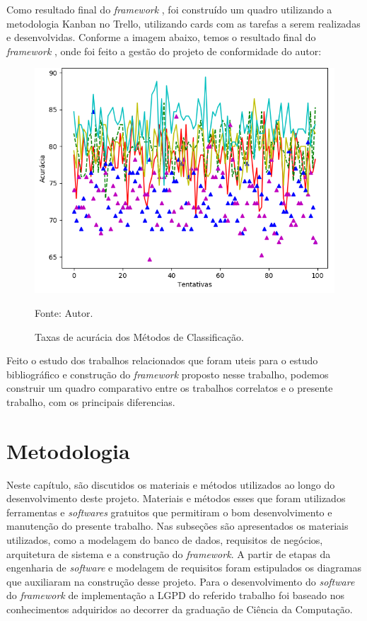 \documentclass[
	12pt,				%
	openright,			%
	oneside,			%
	a4paper,			%
	english,			%
	french,				%
	spanish,			%
	brazil,				%
	]{abntex2}
\begin{document}
Como resultado final do \textit{framework} , foi construído um quadro utilizando a metodologia Kanban no Trello, utilizando cards com as tarefas a serem realizadas e desenvolvidas. Conforme a imagem abaixo, temos o resultado final do \textit{framework} , onde foi feito a gestão do projeto de conformidade do autor:

\begin{figure}[ht]
    \centering
    \caption{Taxas de acurácia dos Métodos de Classificação.}
    \includegraphics[width=5.0in]{Images/acc-classification.png}
    \label{fig: grafico-acc}
    
    \centering \small Fonte: Autor.
\end{figure}

Feito o estudo dos trabalhos relacionados que foram uteis para o estudo bibliográfico e construção do \textit{framework}  proposto nesse trabalho, podemos construir um quadro comparativo entre os trabalhos correlatos e o presente trabalho, com os principais diferencias.





\chapter{Metodologia}
\label{ch: materiais e métodos}

Neste capítulo, são discutidos os materiais e métodos utilizados ao longo do desenvolvimento deste projeto. Materiais e métodos esses que foram utilizados ferramentas e \textit{softwares} gratuitos que permitiram o bom desenvolvimento e manutenção do presente trabalho.
Nas subseções são apresentados os materiais utilizados, como a modelagem do banco de dados, requisitos de negócios, arquitetura de sistema e a construção do \textit{framework}. A partir de etapas da engenharia de \textit{software} e modelagem de requisitos foram estipulados os diagramas que auxiliaram na construção desse projeto.
Para o desenvolvimento do \textit{software} do \textit{framework} de implementação a LGPD do referido trabalho foi baseado nos conhecimentos adquiridos ao decorrer da graduação de Ciência da Computação.
\end{document}
